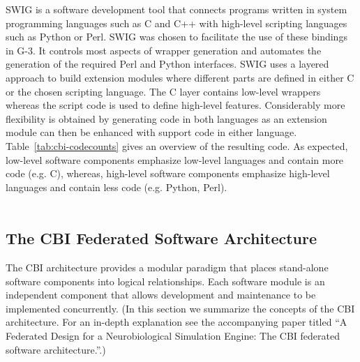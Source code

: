 \documentclass[10pt]{article}
\begin{document}
SWIG is a software development tool that connects programs written
in system programming languages such as C and C++ with high-level scripting 
languages such as Python or Perl. SWIG was chosen to facilitate 
the use of these bindings in
G-3. It controls most aspects of wrapper
generation and automates the generation of the required Perl and
Python interfaces. SWIG uses a layered approach to build extension
modules where different parts are defined in either C or the chosen
scripting language. The C layer contains low-level wrappers whereas
the script code is used to define high-level features.  Considerably
more flexibility is obtained by generating code in both languages as
an extension module can then be enhanced with support code in either
language.  Table~\ref{tab:cbi-codecounts} gives an overview of the
resulting code.  As expected, low-level software components emphasize
low-level languages and contain more code (e.g. C), whereas, high-level
software components emphasize high-level languages and contain less
code (e.g. Python, Perl).\\

\\

\subsection*{The CBI Federated Software Architecture}
\label{subsec:cbi}

The CBI architecture provides a modular paradigm that places stand-alone
software components into logical relationships.  Each software module
is an independent component that allows development and
maintenance to be implemented concurrently.
(In this section we summarize the concepts of the CBI architecture.
For an in-depth explanation see the accompanying paper titled ``A
Federated Design for a Neurobiological Simulation Engine: The CBI
federated software architecture.''.)
\end{document}
